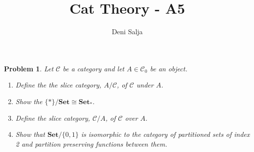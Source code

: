 \documentclass[11pt]{amsart}
\title{Cat Theory - A5}
\author{Deni Salja}
\theoremstyle{plain}
\newtheorem{prob}[thm]{Problem}
\theoremstyle{definition}
\newcommand{\cC}{{\mathcal C}}
\newcommand{\Set}{{\mathbf{Set}}}
\begin{document}
\maketitle

\begin{prob}
Let $\cC$ be a category and let $A \in \cC_0$ be an object. 
\begin{enumerate}[]
\item[1] Define the the slice category, $A/\cC$, of $\cC$ under $A$. 
\item[2] Show the $\{*\}/\Set \cong \Set_*$. 
\item[3] Define the slice category, $\cC/A$, of $\cC$ over $A$. 
\item[4] Show that $\Set/\{ 0,1\}$ is isomorphic to the category of partitioned sets of index 2 and partition preserving functions between them.
\end{enumerate}
\end{prob}
\end{document}
